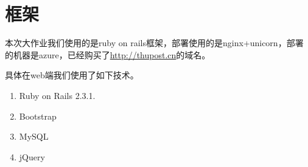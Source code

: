 \section{框架}
本次大作业我们使用的是ruby on rails框架，部署使用的是nginx+unicorn，部署的机器是azure，已经购买了\url{http://thupost.cn}的域名。

具体在web端我们使用了如下技术。

\begin{enumerate}
    \item Ruby on Rails 2.3.1.
    \item Bootstrap
    \item MySQL
    \item jQuery
\end{enumerate}

